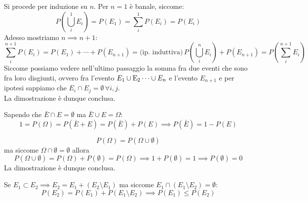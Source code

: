 \documentclass{report}
\begin{document}
	\begin{myproof}
	Si procede per induzione su $n$. Per $n = 1$ è banale, siccome:
	$$
		P \left( \bigcup_i^1 E_i \right) = P(E_1) = \sum_i^1 P(E_i) = P(E_i)
	$$
	Adesso mostriamo $n \implies n+1$:
	$$
		\sum_i^{n+1} P(E_i) = P(E_1) + \cdots + P(E_{n+1}) = \text{(ip. induttiva)} \, P \left(\bigcup_i^n E_i \right) + P(E_{n+1}) = P \left( \sum_{i}^{n+1} E_i \right)
	$$
	Siccome possiamo vedere nell'ultimo passaggio la somma fra due eventi che sono fra loro disgiunti, ovvero fra l'evento $E_1 \cup \operatorname{E}_2 \cdots \cup E_n$ e l'evento $E_{n+1}$ e per ipotesi sappiamo che $E_i \cap E_j = \emptyset \, \forall i,j$. \\
	La dimostrazione è dunque conclusa.
	\end{myproof}
	\begin{myproof}
		Sapendo che $\bar{E} \cap E = \emptyset$ ma $\bar{E} \cup E = \Omega$:
		$$ 1 = P(\Omega) = P(\bar{E} + E) = P(\bar{E}) + P(E) \implies P(\bar{E}) = 1 - P(E)$$
	\end{myproof}
	\begin{myproof}
		$$
			P(\Omega) = P(\Omega \cup \emptyset)
		$$
		ma siccome $\Omega \cap \emptyset = \emptyset$ allora
		$$
			P(\Omega \cup \emptyset) = P(\Omega) + P(\emptyset) = P(\Omega) \implies 1 + P(\emptyset) = 1 \implies P(\emptyset) = 0
		$$
		La dimostrazione è dunque conclusa.
	\end{myproof}
	\begin{myproof}
		Se $E_1 \subset E_2 \implies E_2 = E_1 + (E_2 \setminus E_1)$ ma siccome $E_1 \cap (E_1 \setminus E_2) = \emptyset$:
		$$P(E_2) = P(E_1) + P(E_1 \setminus E_2) \implies P(E_1) \leq P(E_2)$$
	\end{myproof}
\end{document}
